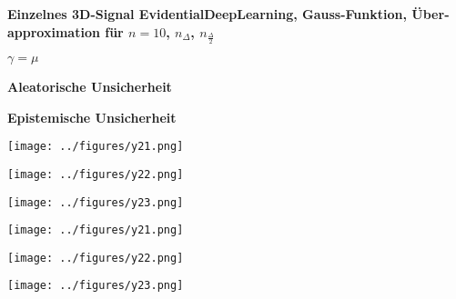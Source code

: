 \begin{otherlanguage}{ngerman}
\begin{samepage}
\begin{minipage}{\textwidth}

\noindent\textbf{Einzelnes 3D-Signal \gls{EvidentialDeepLearning}, Gauss-Funktion,
Überapproximation für $n=10$, $n_{\Delta}$, $n_{\frac{\Delta}{2}}$}


\begin{minipage}{0.05\textwidth}\vspace{0.5cm}\end{minipage}%
\begin{minipage}{0.3\textwidth}\centering \textbf{$\gamma=\mu$}\end{minipage}%
\begin{minipage}{0.3\textwidth}\centering \textbf{Aleatorische Unsicherheit}\end{minipage}%
\begin{minipage}{0.3\textwidth}\centering \textbf{Epistemische Unsicherheit}\end{minipage}

\vspace{0.125cm}

\begin{minipage}{0.05\textwidth}\centering{}\end{minipage}%
\begin{minipage}{0.3\textwidth}\centering\texttt{[image: ../figures/y21.png]}\end{minipage}%
\begin{minipage}{0.3\textwidth}\centering\texttt{[image: ../figures/y22.png]}\end{minipage}%
\begin{minipage}{0.3\textwidth}\centering\texttt{[image: ../figures/y23.png]}\end{minipage}

\vspace{0.125cm}

\begin{minipage}{0.05\textwidth}\centering{}\end{minipage}%
\begin{minipage}{0.3\textwidth}\centering\texttt{[image: ../figures/y21.png]}\end{minipage}%
\begin{minipage}{0.3\textwidth}\centering\texttt{[image: ../figures/y22.png]}\end{minipage}%
\begin{minipage}{0.3\textwidth}\centering\texttt{[image: ../figures/y23.png]}\end{minipage}


\end{minipage}
\end{samepage}
\end{otherlanguage}
